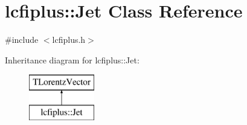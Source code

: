\section{lcfiplus\-:\-:Jet Class Reference}
\label{classlcfiplus_1_1Jet}


{\ttfamily \#include $<$lcfiplus.\-h$>$}

Inheritance diagram for lcfiplus\-:\-:Jet\-:\begin{figure}[H]
\begin{center}
\leavevmode
\includegraphics[height=2.000000cm]{classlcfiplus_1_1Jet}
\end{center}
\end{figure}

